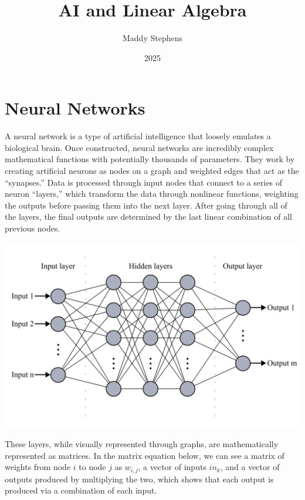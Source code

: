 \documentclass{article}
\title{AI and Linear Algebra}
\author{Maddy Stephens}
\date{2025}
\begin{document}
\maketitle

\section{Neural Networks}
A neural network is a type of artificial intelligence that loosely emulates a biological brain. Once constructed, neural networks are incredibly complex mathematical functions with potentially thousands of parameters. They work by creating artificial neurons as nodes on a graph and weighted edges that act as the “synapses.” Data is processed through input nodes that connect to a series of neuron “layers,” which transform the data through nonlinear functions, weighting the outputs before passing them into the next layer. After going through all of the layers, the final outputs are determined by the last linear combination of all previous nodes.\\
\begin{center}
    \includegraphics[scale=0.22]{neuralnet.png}
\end{center}
These layers, while visually represented through graphs, are mathematically represented as matrices. In the matrix equation below, we can see a matrix of weights from node $i$ to node $j$ as $w_{i,j}$, a vector of inputs $in_k$, and a vector of outputs produced by multiplying the two, which shows that each output is produced via a combination of each input. \\
\end{document}
